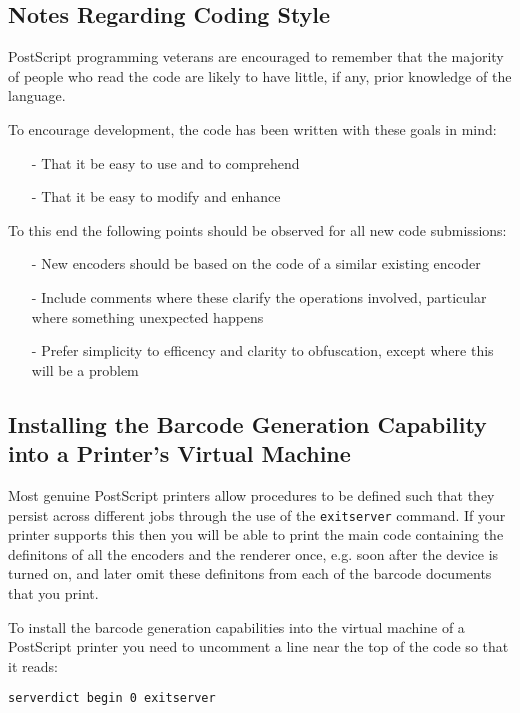 \documentclass{article}
\begin{document}
\subsection{Notes Regarding Coding Style}

PostScript programming veterans are encouraged to remember that the
majority of people who read the code are likely to have little,
if any, prior knowledge of the language.

To encourage development, the code has been written with these
goals in mind:

\begin{itemize}
\item[-]{That it be easy to use and to comprehend}
\item[-]{That it be easy to modify and enhance}
\end{itemize}

To this end the following points should be observed for all new
code submissions:

\begin{itemize}
\item[-]{New encoders should be based on the code of a similar
existing encoder}
\item[-]{Include comments where these clarify the operations 
involved, particular where something unexpected happens}
\item[-]{Prefer simplicity to efficency and clarity to
obfuscation, except where this will be a problem}
\end{itemize}

\subsection{Installing the Barcode Generation Capability into a Printer's Virtual Machine}

Most genuine PostScript printers allow procedures to be defined such 
that they persist across different jobs through the use of the \texttt{exitserver}
command. If your printer supports this then you will be able to print
the main code containing the definitons of all the encoders and the
renderer once, e.g. soon after the device is turned on, and later omit
these definitons from each of the barcode documents that you print.

To install the barcode generation capabilities into the 
virtual machine of a PostScript printer you need to uncomment a line near the
top of the code so that it reads:

\begin{lstlisting}
serverdict begin 0 exitserver
\end{lstlisting}
\end{document}
